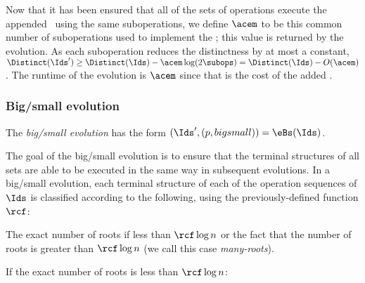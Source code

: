 Now that it has been ensured that all of the sets of operations execute the appended \opEm\ using the same suboperations, we 
define $\acem$ to be this common number of suboperations used to implement the \opEm; this value is returned by the evolution. As each suboperation reduces the distinctness by at most a constant,
$\Distinct(\Ids') \geq \Distinct(\Ids)-\acem \log (2 \subops)=  \Distinct(\Ids)- O(\acem)$. The runtime of the evolution is $\acem$ since that is the cost of the added \opEm.


\subsubsection{Big/small evolution} 
The \emph{big/small evolution} has the form $(\Ids',(p,bigsmall))=\eBs(\Ids)$.
\begin{fullonly}

\end{fullonly}
The goal of the big/small evolution is to ensure that the terminal structures of all sets are able to be executed in the same way in subsequent evolutions.
In a big/small evolution, each terminal structure of each of the operation sequences of $\Ids$ is classified according to the following, using the previously-defined function $\rcf$: 
\begin{itemize\shortfull{*}{}}

\item The exact number of roots if less than $\rcf  \log n$ or the fact that the number of roots is greater than $\rcf  \log n$ (we call this case \emph{many-roots}). 

\item If the exact number of roots is less than ${\rcf  \log n}$:
\begin{fullonly}
\end{fullonly}


\end{itemize\shortfull{*}{}}

